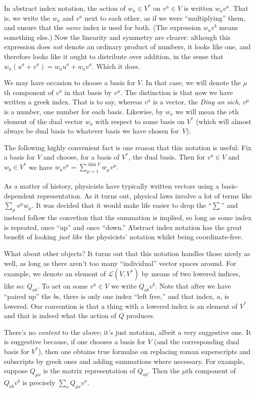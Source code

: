 \documentclass[10pt, a4paper]{article}
\begin{document}
In abstract index notation, the action of $w_a\in V^*$ on $v^a\in V$ is
written $w_av^a$. That is, we write the $w_a$ and $v^a$ next to each
other, as if we were “multiplying” them, and ensure that the
\emph{same} index is used for both. (The expression $w_av^b$ means
something else.) Now the linearity and symmetry are clearer: although
this expression does \emph{not} denote an ordinary product of numbers,
it looks like one, and therefore looks like it ought to distribute
over addition, in the sense that $w_a(u^a+v^a) = w_au^a +
w_av^a$. Which it does.

We may have occasion to choose a basis for $V$. In that case, we will
denote the $\mu$th component of $v^a$ in that basis by $v^\mu$. The
distinction is that now we have written a greek index. That is to say,
whereas $v^a$ is a vector, the \emph{Ding an sich}, $v^\mu$ is a number,
one number for each basis. Likewise, by $w_\nu$ we will mean the
$\nu$th element of the dual vector $w_a$ with respect to some basis
on $V^*$ (which will almost always be dual basis to whatever basis we
have chosen for~$V$).

The following highly convenient fact is one reason that this notation
is useful: Fix a basis for $V$ and choose, for a basis of $V^*$, the
dual basis. Then for $v^a\in V$ and $w_b\in V^*$ we have
$w_av^a = \sum_{\mu=1}^{\dim V} w_\mu v^\mu$.

As a matter of history, physicists have typically written vectors
using a basis-dependent representation. As it turns out, physical laws
involve a lot of terms like $\sum_\mu v^\mu w_\mu$. It was decided that it
would make life easier to drop the “$\sum$” and instead follow the
convetion that the summation is implied, so long as some index is
repeated, once “up” and once “down.” Abstract index notation has the
great benefit of looking \emph{just like} the physicists' notation
whilst being coordinate-free.

What about other objects? It turns out that this notation handles
those nicely as well, as long as there aren't too many “individual”
vector spaces around. For example, we denote an element of
$\mathcal{L}(V,V^*)$ by means of two lowered indices, like so:
$Q_{ab}$. To act on some $v^a\in V$ we write $Q_{ab}v^b$. Note that
after we have “paired up” the $b$s, there is only one index “left
free,” and that index, $a$, is lowered. Our convention is that a thing
with a lowered index is an element of $V^*$ and that is indeed what
the action of $Q$ produces.

There's no \emph{content} to the above; it's just notation, albeit a
very suggestive one. It is suggestive because, if one chooses a basis
for $V$ (and the corresponding dual basis for $V^*$), then one obtains
true formulae on replacing roman superscripts and subscripts by greek
ones and adding summations where necessary. For example, suppose
$Q_{\mu\nu}$ is the matrix representation of $Q_{ab}$. Then the
$\mu$th component of $Q_{ab}v^b$ is precisely $\sum_\nu Q_{\mu\nu}v^\nu$.
\end{document}
